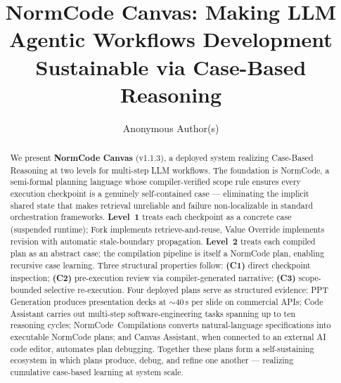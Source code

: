 \documentclass[runningheads]{llncs}
\begin{document}
\title{NormCode Canvas: Making LLM Agentic Workflows Development Sustainable via Case-Based Reasoning}


\author{Anonymous Author(s)}


\maketitle

\begin{abstract}
We present \textbf{NormCode Canvas} (v1.1.3), a deployed system realizing
Case-Based Reasoning at two levels for multi-step LLM workflows. The foundation
is NormCode, a semi-formal planning language whose compiler-verified
scope rule ensures every execution checkpoint is a genuinely self-contained case ---
eliminating the implicit shared state that makes retrieval unreliable and failure
non-localizable in standard orchestration frameworks.
\textbf{Level~1} treats each checkpoint as a concrete case (suspended runtime);
Fork implements retrieve-and-reuse, Value Override implements revision with automatic
stale-boundary propagation.
\textbf{Level~2} treats each compiled plan as an abstract case; the compilation
pipeline is itself a NormCode plan, enabling recursive case learning.
Three structural properties follow: \textbf{(C1)} direct checkpoint
inspection; \textbf{(C2)} pre-execution review via compiler-generated narrative;
\textbf{(C3)} scope-bounded selective re-execution.
Four deployed plans serve as structured evidence: PPT Generation produces
presentation decks at ${\sim}40$\,s per slide on commercial APIs; Code Assistant
carries out multi-step software-engineering tasks spanning up to ten reasoning
cycles; NormCode~Compilations converts natural-language specifications into executable
NormCode plans; and Canvas Assistant, when connected to an external AI code editor,
automates plan debugging. Together these plans form a self-sustaining ecosystem in
which plans produce, debug, and refine one another --- realizing cumulative
case-based learning at system scale.

\end{abstract}
\end{document}
